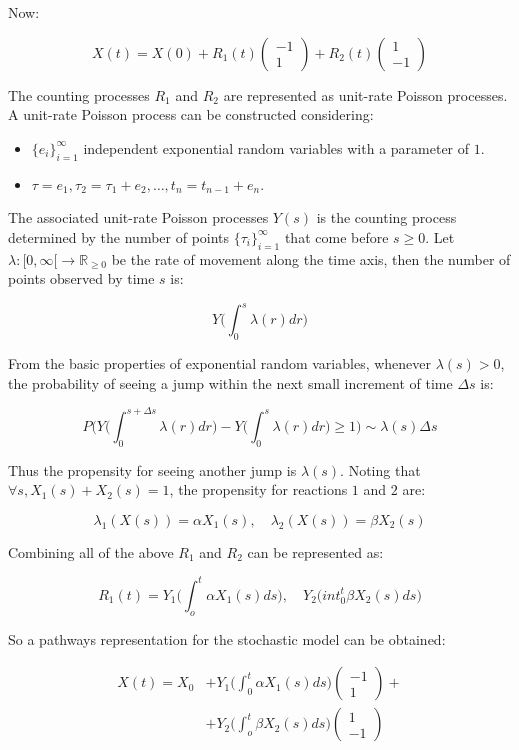 	Now:

	$$X(t) = X(0) + R_1(t)\begin{pmatrix}-1\\1\end{pmatrix} + R_2(t)\begin{pmatrix}1\\-1\end{pmatrix}$$

	The counting processes $R_1$ and $R_2$ are represented as unit-rate Poisson processes.
	A unit-rate Poisson process can be constructed considering:

	\begin{itemize}
		\item $\{e_i\}_{i=1}^{\infty}$ independent exponential random variables with a parameter of $1$.
		\item $\tau=e_1, \tau_2 = \tau_1+e_2, \dots, t_n = t_{n-1} + e_n$.
	\end{itemize}

	The associated unit-rate Poisson processes $Y(s)$ is the counting process determined by the number of points $\{\tau_i\}_{i=1}^{\infty}$ that come before $s \ge 0$.
	Let $\lambda:[0, \infty[\rightarrow\mathbb{R}_{\ge 0}$ be the rate of movement along the time axis, then the number of points observed by time $s$ is:

	$$Y\biggl(\int_0^{s}\lambda(r)dr\biggr)$$

	From the basic properties of exponential random variables, whenever $\lambda(s)>0$, the probability of seeing a jump within the next small increment of time $\Delta s$ is:

	$$P\biggl(Y\biggl(\int_{0}^{s+\Delta s}\lambda(r)dr\biggr)-Y\biggl(\int_{0}^{s}\lambda(r)dr\biggr)\ge 1\biggr)\sim \lambda(s)\Delta s$$

	Thus the propensity for seeing another jump is $\lambda(s)$.
	Noting that $\forall s, X_1(s) + X_2(s)=1$, the propensity for reactions $1$ and $2$ are:

	$$\lambda_1(X(s))=\alpha X_1(s), \quad\lambda_2(X(s)) = \beta X_2(s)$$

	Combining all of the above $R_1$ and $R_2$ can be represented as:

	$$R_1(t) = Y_1\biggl(\int_o^t\alpha X_1(s)ds\biggr), \quad Y_2\biggl(int_0^t\beta X_2(s)ds\biggr)$$

	So a pathways representation for the stochastic model can be obtained:

	\begin{align*}
		X(t) = X_0 &+ Y_1\biggl(\int_0^t \alpha X_1(s)ds\biggr)\begin{pmatrix}-1\\1\end{pmatrix} +\\
							 &+ Y_2\biggl(\int_o^t\beta X_2(s)ds\biggr)\begin{pmatrix}1\\-1\end{pmatrix}
	\end{align*}

